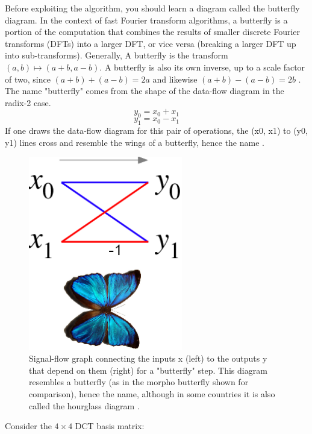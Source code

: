 \documentclass[a4paper,12pt,twoside]{article}
\begin{document}
Before exploiting the algorithm, you should learn a diagram called the butterfly diagram. In the context of fast Fourier transform algorithms, a butterfly is a portion of the computation that combines the results of smaller discrete Fourier transforms (DFTs) into a larger DFT, or vice versa (breaking a larger DFT up into sub-transforms). Generally, A butterfly is the transform $(a, b) \mapsto (a + b, a - b)$. A butterfly is also its own inverse, up to a scale factor of two, since $(a+b) + (a-b) = 2a$ and likewise $(a+b) - (a-b) = 2b$ \cite{ryg}. The name "butterfly" comes from the shape of the data-flow diagram in the radix-2 case.
\begin{equation}
    y_{0}=x_{0}+x_{1}
\end{equation}
\begin{equation}
    y_{1}=x_{0}-x_{1}
\end{equation}
If one draws the data-flow diagram for this pair of operations, the (x0, x1) to (y0, y1) lines cross and resemble the wings of a butterfly, hence the name \cite{enwiki:1111230153}.
\begin{figure}[H]
    \centering
    \includegraphics[width=0.6\textwidth]{images/22.png}
    \caption{Signal-flow graph connecting the inputs x (left) to the outputs y that depend on them (right) for a "butterfly" step. This diagram resembles a butterfly (as in the morpho butterfly shown for comparison), hence the name, although in some countries it is also called the hourglass diagram \cite{butterflypic}.}
\end{figure}
Consider the $4\times4$ DCT basis matrix:
\end{document}
